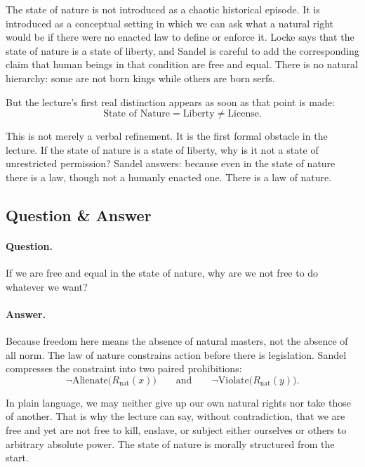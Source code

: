 The state of nature is not introduced as a chaotic historical episode. It is introduced as a conceptual setting in which we can ask what a natural right would be if there were no enacted law to define or enforce it. Locke says that the state of nature is a state of liberty, and Sandel is careful to add the corresponding claim that human beings in that condition are free and equal. There is no natural hierarchy: some are not born kings while others are born serfs.

But the lecture's first real distinction appears as soon as that point is made:
\begin{equation}
\text{State of Nature}=\text{Liberty}\neq \text{License}.
\end{equation}

This is not merely a verbal refinement. It is the first formal obstacle in the lecture. If the state of nature is a state of liberty, why is it not a state of unrestricted permission? Sandel answers: because even in the state of nature there is a law, though not a humanly enacted one. There is a law of nature.

\subsection{Question \& Answer}

\paragraph{Question.} If we are free and equal in the state of nature, why are we not free to do whatever we want?

\paragraph{Answer.} Because freedom here means the absence of natural masters, not the absence of all norm. The law of nature constrains action before there is legislation. Sandel compresses the constraint into two paired prohibitions:
\begin{equation}
\neg \text{Alienate}\big(R_{\mathrm{nat}}(x)\big)
\qquad\text{and}\qquad
\neg \text{Violate}\big(R_{\mathrm{nat}}(y)\big).
\end{equation}

In plain language, we may neither give up our own natural rights nor take those of another. That is why the lecture can say, without contradiction, that we are free and yet are not free to kill, enslave, or subject either ourselves or others to arbitrary absolute power. The state of nature is morally structured from the start.

